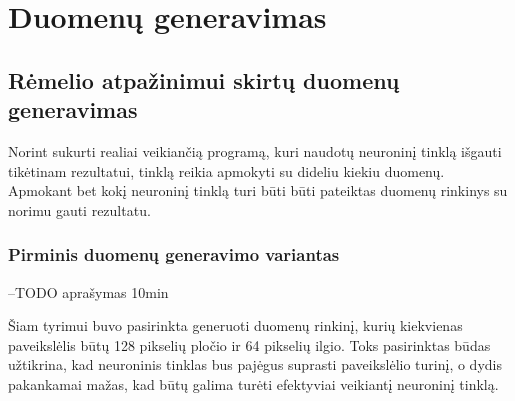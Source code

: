 \documentclass{VUMIFInfBakalaurinis}
\begin{document}

\pagebreak
\section{Duomenų generavimas}

\subsection{Rėmelio atpažinimui skirtų duomenų generavimas} \label{Mokymo duomenų generavimas}
Norint sukurti realiai veikiančią programą, kuri naudotų neuroninį tinklą išgauti tikėtinam rezultatui,
tinklą reikia apmokyti su dideliu kiekiu duomenų. Apmokant bet kokį neuroninį tinklą turi būti būti pateiktas
duomenų rinkinys su norimu gauti rezultatu. 

\subsubsection{Pirminis duomenų generavimo variantas}
--TODO
aprašymas 10min


Šiam tyrimui buvo pasirinkta generuoti duomenų rinkinį, kurių kiekvienas paveikslėlis būtų 128 pikselių
pločio ir 64 pikselių ilgio. Toks pasirinktas būdas užtikrina, kad neuroninis tinklas bus pajėgus suprasti 
paveikslėlio turinį, o dydis pakankamai mažas, kad būtų galima turėti efektyviai veikiantį neuroninį tinklą.
\end{document}
